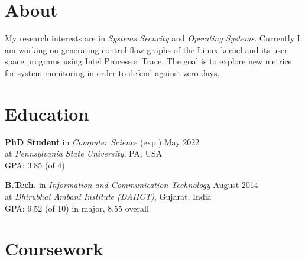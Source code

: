 \documentclass[margin]{res}
\newcommand{\daiict}{\textsc{DAIICT}}
\begin{document}
\begin{resume}

\section{About}
My research interests are in \emph{Systems Security} and \emph{Operating Systems}.
Currently I am working on generating control-flow graphs of the Linux kernel and its 
user-space programs using Intel\textsuperscript{\textregistered} Processor Trace.
The goal is to explore new metrics for system monitoring in order to defend against zero days.

\section{Education}

\textbf{PhD Student} in \emph{Computer Science} \hfill (exp.) May 2022\\
at \emph{Pennsylvania State University}, PA, USA\\
GPA: 3.85 (of 4)

\textbf{B.Tech.} in \emph{Information and Communication Technology} \hfill August 2014\\
at \emph{Dhirubhai Ambani Institute (\daiict)}, Gujarat, India\\
GPA: 9.52 (of 10) in major,
8.55 overall 

\section{Coursework}


\end{resume}
\end{document}

